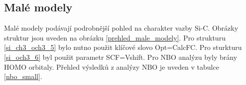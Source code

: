 \documentclass[
  digital, %
  table,   %
  lof,     %
  lot,     %
  oneside,
]{fithesis3}
\begin{document}
\subsection{Malé modely}
Malé modely podávají podrobnější pohled na charakter vazby Si-C. Obrázky struktur jsou uveden na obrázku \ref{prehled_male_modely}. Pro strukturu  \ref{si_ch3_och3_5} bylo nutno použit klíčové slovo Opt=CalcFC. Pro sturkturu  \ref{si_och3_6} byl použit parametr SCF=Vshift. Pro NBO analýzu byly brány HOMO orbitaly. Přehled výsledků z analýzy NBO je uveden v tabulce \ref{nbo_small}.
\begin{figure}
\begin{center}

\end{center}
\end{figure}
\end{document}
